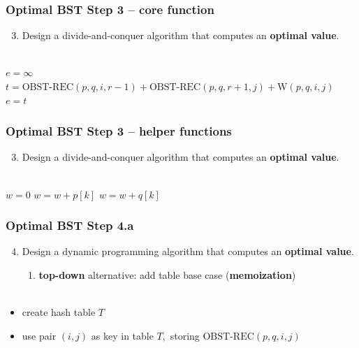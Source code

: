 \documentclass[10pt,aspectratio=169]{beamer}
\newcommand{\stanza}{ \\~\ }
\begin{document}
\begin{frame} \frametitle{Optimal BST Step 3 -- core function}
  \begin{enumerate}
    \setcounter{enumi}{2}
    \item Design a divide-and-conquer algorithm that computes an \textbf{optimal value}.
    \stanza
  \end{enumerate}

  {\scriptsize
  \begin{algorithmic}[1]
      \State {}
    \EndIf
    \State $e = \infty$
      \State $t = \text{OBST-REC}(p, q, i, r-1) + \text{OBST-REC}(p, q, r+1, j) + \text{W}(p, q, i, j)$
        \State $e = t$
      \EndIf
    \EndFor
    \State {}
    \EndFunction
  \end{algorithmic}
  }
\end{frame}

\begin{frame} \frametitle{Optimal BST Step 3 -- helper functions}
  \begin{enumerate}
    \setcounter{enumi}{2}
    \item Design a divide-and-conquer algorithm that computes an \textbf{optimal value}.
    \stanza
  \end{enumerate}

  {\scriptsize
  \begin{algorithmic}[1]
      \State {}
    \EndFunction
      \State $w = 0$
        \State $w = w + p[k]$
      \EndFor
        \State $w = w + q[k]$
      \EndFor
      \State {}
    \EndFunction
  \end{algorithmic}
  }
\end{frame}

\begin{frame} \frametitle{Optimal BST Step 4.a}
  \begin{enumerate}
    \setcounter{enumi}{3}
    \item Design a dynamic programming algorithm that computes an \textbf{optimal value}.
    \begin{enumerate}
      \item \textbf{top-down} alternative: add table base case (\textbf{memoization})
      \stanza
    \end{enumerate}
\end{enumerate}

\begin{itemize}
  \item create hash table $T$
  \item use pair $(i, j)$ as key in table $T,$ storing $\text{OBST-REC}(p, q, i, j)$
\end{itemize}
\end{frame}
\end{document}
